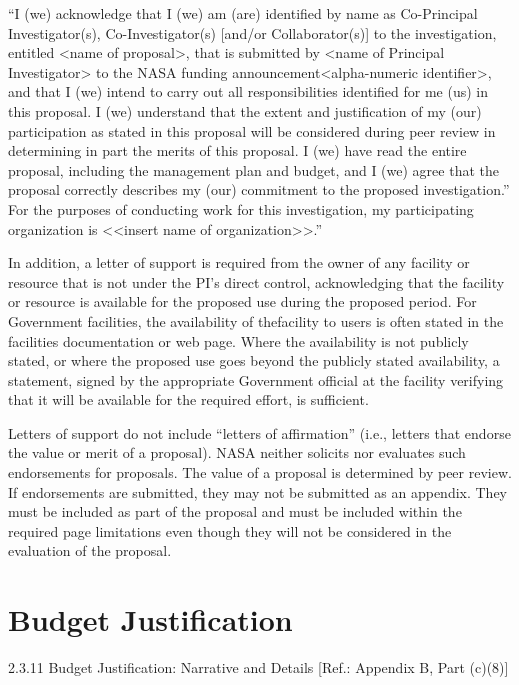 \documentclass[12pt]{article}
\begin{document}
``I (we) acknowledge that I (we) am (are) identified by name as
Co-Principal Investigator(s), Co-Investigator(s) [and/or
Collaborator(s)] to the investigation, entitled <name of proposal>,
that is submitted by <name of Principal Investigator> to the NASA
funding announcement<alpha-numeric identifier>, and that I (we) intend
to carry out all responsibilities identified for me (us) in this
proposal. I (we) understand that the extent and justification of my
(our) participation as stated in this proposal will be considered
during peer review in determining in part the merits of this
proposal. I (we) have read the entire proposal, including the
management plan and budget, and I (we) agree that the proposal
correctly describes my (our) commitment to the proposed
investigation.'' For the purposes of conducting work for this
investigation, my participating organization is <<insert name of
organization>>.''

In addition, a letter of support is required from the owner of any
facility or resource that is not under the PI's direct control,
acknowledging that the facility or resource is available for the
proposed use during the proposed period. For Government facilities,
the availability of thefacility to users is often stated in the
facilities documentation or web page. Where the availability is not
publicly stated, or where the proposed use goes beyond the publicly
stated availability, a statement, signed by the appropriate Government
official at the facility verifying that it will be available for the
required effort, is sufficient.

Letters of support do not include ``letters of affirmation'' (i.e.,
letters that endorse the value or merit of a proposal). NASA neither
solicits nor evaluates such endorsements for proposals. The value of a
proposal is determined by peer review. If endorsements are submitted,
they may not be submitted as an appendix. They must be included as
part of the proposal and must be included within the required page
limitations even though they will not be considered in the evaluation
of the proposal.



\cleardoublepage

\section*{Budget Justification}
2.3.11 Budget Justification: Narrative and Details [Ref.: Appendix B, Part (c)(8)]
\end{document}
